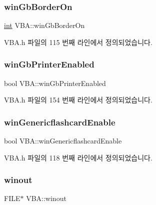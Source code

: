 \subsubsection{\texorpdfstring{win\+Gb\+Border\+On}{winGbBorderOn}}
{\footnotesize\ttfamily \mbox{\hyperlink{_util_8cpp_a0ef32aa8672df19503a49fab2d0c8071}{int}} V\+B\+A\+::win\+Gb\+Border\+On}



V\+B\+A.\+h 파일의 115 번째 라인에서 정의되었습니다.

\mbox{\label{class_v_b_a_ad02c13c4fea97781a17ca6c9f9cdaa49}} 
\subsubsection{\texorpdfstring{win\+Gb\+Printer\+Enabled}{winGbPrinterEnabled}}
{\footnotesize\ttfamily bool V\+B\+A\+::win\+Gb\+Printer\+Enabled}



V\+B\+A.\+h 파일의 154 번째 라인에서 정의되었습니다.

\mbox{\label{class_v_b_a_ac51ec97cd7b489be24edc77f346e5de7}} 
\subsubsection{\texorpdfstring{win\+Genericflashcard\+Enable}{winGenericflashcardEnable}}
{\footnotesize\ttfamily bool V\+B\+A\+::win\+Genericflashcard\+Enable}



V\+B\+A.\+h 파일의 118 번째 라인에서 정의되었습니다.

\mbox{\label{class_v_b_a_a62dbeb6d37279fa4d58f644af8b12d88}} 
\subsubsection{\texorpdfstring{winout}{winout}}
{\footnotesize\ttfamily F\+I\+LE$\ast$ V\+B\+A\+::winout}




